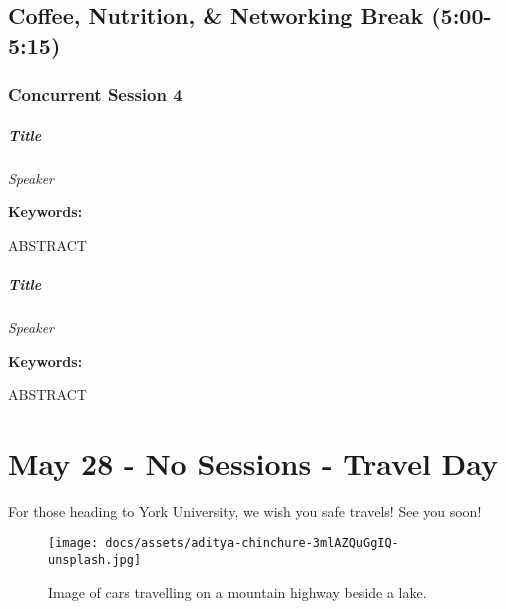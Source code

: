 \documentclass[
]{book}
\begin{document}
\hypertarget{coffee-nutrition-networking-break-500-515}{%
\section*{Coffee, Nutrition, \& Networking Break (5:00-5:15)}\label{coffee-nutrition-networking-break-500-515}}

\hypertarget{concurrent-session-4}{%
\subsection*{Concurrent Session 4}\label{concurrent-session-4}}

\begin{speaker}
\hypertarget{title}{%
\paragraph{\texorpdfstring{\textbf{Title}}{Title}}\label{title}}

\emph{Speaker}

\textbf{Keywords:}

ABSTRACT
\end{speaker}
\begin{speaker}
\hypertarget{title}{%
\paragraph{\texorpdfstring{\textbf{Title}}{Title}}\label{title}}

\emph{Speaker}

\textbf{Keywords:}

ABSTRACT
\end{speaker}

\hypertarget{may-28---no-sessions---travel-day}{%
\chapter{May 28 - No Sessions - Travel Day}\label{may-28---no-sessions---travel-day}}

For those heading to York University, we wish you safe travels! See you soon!

\begin{figure}
\centering
\texttt{[image: docs/assets/aditya-chinchure-3mlAZQuGgIQ-unsplash.jpg]}
\caption{Image of cars travelling on a mountain highway beside a lake.}
\end{figure}
\end{document}
